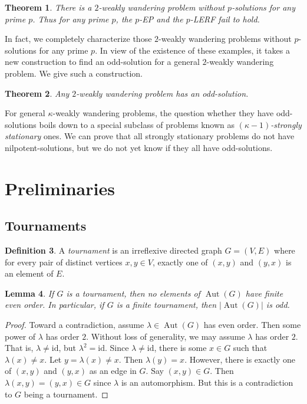 \documentclass[10pt,a4paper]{amsart}
\newtheorem{theorem}{Theorem}[section]
\newtheorem{lemma}[theorem]{Lemma}
\theoremstyle{definition}
\newtheorem{definition}[theorem]{Definition}
\theoremstyle{definition}
\numberwithin{equation}{section}
\DeclareMathOperator{\Aut}{Aut}
\begin{document}
\begin{theorem}\label{thm:pEP} There is a $2$-weakly wandering problem without $p$-solutions for any prime $p$. Thus for any prime $p$,  the $p$-{\rm EP} and the $p$-{\rm LERF} fail to hold.
\end{theorem}

In fact, we completely characterize those $2$-weakly wandering problems without $p$-solutions for any prime $p$. In view of the existence of these examples, it takes a new construction to find an odd-solution for a general $2$-weakly wandering problem. We give such a construction.

\begin{theorem}\label{thm:main2weaklywandering} Any $2$-weakly wandering problem has an odd-solution.
\end{theorem}


For general $\kappa$-weakly wandering problems, the question whether they have odd-solutions boils down to a special subclass of problems known as \emph{$(\kappa-1)$-strongly stationary} ones. We can prove that all strongly stationary problems do not have nilpotent-solutions, but we do not yet know if they all have odd-solutions.




\section{Preliminaries}


\subsection{Tournaments}

\begin{definition} A {\em tournament} is an irreflexive directed graph $G=(V, E)$ where for every pair of distinct vertices $x, y\in V$, exactly one of $(x,y)$ and $(y,x)$ is an element of $E$.
\end{definition}


\begin{lemma}\label{lem:aut} If $G$ is a tournament, then no elements of $\Aut(G)$ have finite even order. In particular, if $G$ is a finite tournament, then $|\Aut(G)|$ is odd.
\end{lemma}

\begin{proof} Toward a contradiction, assume $\lambda\in \Aut(G)$ has even order. Then some power of $\lambda$ has order $2$. Without loss of generality, we may assume $\lambda$ has order $2$. That is, $\lambda\neq \mbox{id}$, but $\lambda^2=\mbox{id}$. Since $\lambda\neq\mbox{id}$, there is some $x\in G$ such that $\lambda(x)\neq x$. Let $y=\lambda(x)\neq x$. Then $\lambda(y)=x$. However, there is exactly one of $(x, y)$ and $(y,x)$ as an edge in $G$. Say $(x,y)\in G$. Then $\lambda(x,y)=(y,x)\in G$ since $\lambda$ is an automorphism. But this is a contradiction to $G$ being a tournament. 
\end{proof}
\end{document}
